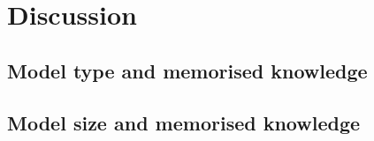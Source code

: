 \section{Discussion}
\label{discussion}

\subsection{Model type and memorised knowledge}
\label{model_type_parametric}

\subsection{Model size and memorised knowledge}
\label{model_size_parametric}
